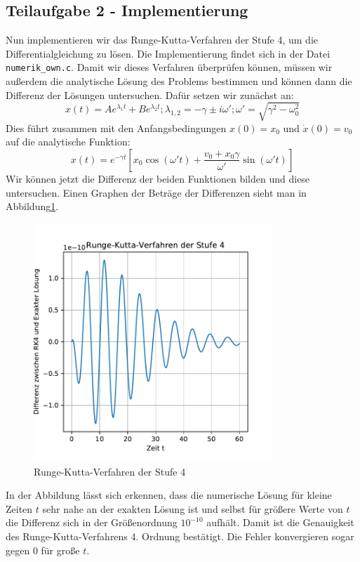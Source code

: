 \documentclass[12pt,a4paper]{article}
\begin{document}
\subsection{Teilaufgabe 2 - Implementierung}
Nun implementieren wir das Runge-Kutta-Verfahren der Stufe 4, um die Differentialgleichung zu lösen. Die Implementierung findet sich in der Datei \verb|numerik_own.c|. Damit wir dieses Verfahren überprüfen können, müssen wir außerdem die analytische Lösung des Problems bestimmen und können dann die Differenz der Lösungen untersuchen. Dafür setzen wir zunächst an:
\begin{equation}
	x(t) = Ae^{\lambda_1t} + Be^{\lambda_2t} ; \lambda_{1,2} = -\gamma \pm i\omega'; \omega' = \sqrt{\gamma^2 - \omega_0^2}
\end{equation}
Dies führt zusammen mit den Anfangsbedingungen $x(0) = x_0$ und $\dot{x}(0) = v_0$ auf die analytische Funktion:
\begin{equation}
	x(t) = e^{-\gamma t}\left[x_0\cos(\omega't) + \frac{v_0 + x_0\gamma}{\omega'}\sin(\omega't)\right]
\end{equation}
Wir können jetzt die Differenz der beiden Funktionen bilden und diese untersuchen. Einen Graphen der Beträge der Differenzen sieht man in Abbildung\ref{f:rk4}.
\begin{figure}[htbp]
	\includegraphics[width=0.8\textwidth]{Runge_Kutta_Proof.pdf}
	\caption{Runge-Kutta-Verfahren der Stufe 4}\label{f:rk4}
\end{figure}
In der Abbildung lässt sich erkennen, dass die numerische Lösung für kleine Zeiten $t$ sehr nahe an der exakten Lösung ist und selbst für größere Werte von $t$ die Differenz sich in der Größenordnung $10^{-10}$ aufhält. Damit ist die Genauigkeit des Runge-Kutta-Verfahrens 4. Ordnung bestätigt. Die Fehler konvergieren sogar gegen $0$ für große $t$.
\end{document}
